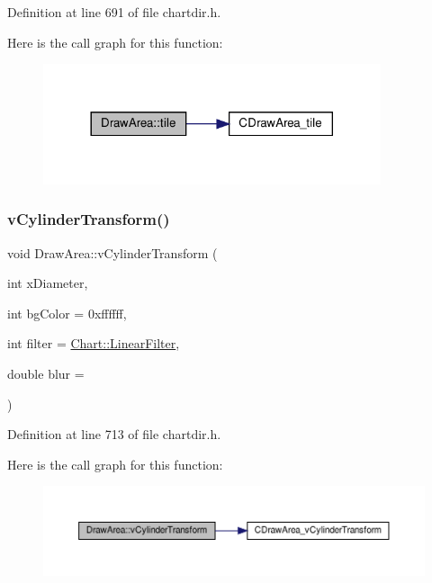 Definition at line 691 of file chartdir.\+h.

Here is the call graph for this function\+:
\nopagebreak
\begin{figure}[H]
\begin{center}
\leavevmode
\includegraphics[width=281pt]{class_draw_area_af73b2087afdb68990aa4f1ccfb2bcb03_cgraph}
\end{center}
\end{figure}
\mbox{\label{class_draw_area_ae618b60c8a4dca272d371588cdc9b71b}} 
\subsubsection{\texorpdfstring{v\+Cylinder\+Transform()}{vCylinderTransform()}}
{\footnotesize\ttfamily void Draw\+Area\+::v\+Cylinder\+Transform (\begin{DoxyParamCaption}\item[{int}]{x\+Diameter,  }\item[{int}]{bg\+Color = {\ttfamily 0xffffff},  }\item[{int}]{filter = {\ttfamily \hyperlink{namespace_chart_ab75b9aa1781d0e0159ef1d441b577764a8cd729b7a982bac2dce8b021511e3ac6}{Chart\+::\+Linear\+Filter}},  }\item[{double}]{blur = {} }\end{DoxyParamCaption})\hspace{0.3cm}{\ttfamily [inline]}}



Definition at line 713 of file chartdir.\+h.

Here is the call graph for this function\+:
\nopagebreak
\begin{figure}[H]
\begin{center}
\leavevmode
\includegraphics[width=350pt]{class_draw_area_ae618b60c8a4dca272d371588cdc9b71b_cgraph}
\end{center}
\end{figure}
\mbox{\label{class_draw_area_a82add495d3776857c69b264055c00362}} 
